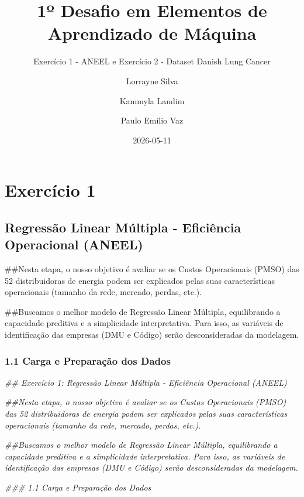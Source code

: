 \documentclass[
  letterpaper,
]{article}
\title{1º Desafio em Elementos de Aprendizado de Máquina}
\subtitle{Exercício 1 - ANEEL e Exercício 2 - Dataset Danish Lung
Cancer}
\author{Lorrayne Silva \and Kammyla Landim \and Paulo Emílio Vaz}
\date{2026-05-11}
\newenvironment{Shaded}{\begin{snugshade}}{\end{snugshade}}
\newcommand{\DocumentationTok}[1]{\textcolor[rgb]{0.37,0.37,0.37}{\textit{#1}}}
\renewcommand*\contentsname{Table of contents}
\newcommand\contentsname{Table of contents}
\begin{document}
\maketitle

\renewcommand*\contentsname{Table of contents}
{
\setcounter{tocdepth}{3}
\tableofcontents
}

\section{Exercício 1}\label{exercuxedcio-1}

\subsection{Regressão Linear Múltipla - Eficiência Operacional
(ANEEL)}\label{regressuxe3o-linear-muxfaltipla---eficiuxeancia-operacional-aneel}

\#\#Nesta etapa, o nosso objetivo é avaliar se os Custos Operacionais
(PMSO) das 52 distribuidoras de energia podem ser explicados pelas suas
características operacionais (tamanho da rede, mercado, perdas, etc.).

\#\#Buscamos o melhor modelo de Regressão Linear Múltipla, equilibrando
a capacidade preditiva e a simplicidade interpretativa. Para isso, as
variáveis de identificação das empresas (DMU e Código) serão
desconsideradas da modelagem.

\subsubsection{1.1 Carga e Preparação dos
Dados}\label{carga-e-preparauxe7uxe3o-dos-dados}

\begin{Shaded}
\begin{Highlighting}[]
\DocumentationTok{\#\# Exercício 1: Regressão Linear Múltipla {-} Eficiência Operacional (ANEEL)}

\DocumentationTok{\#\#Nesta etapa, o nosso objetivo é avaliar se os Custos Operacionais (PMSO) das 52 distribuidoras de energia podem ser explicados pelas suas características operacionais (tamanho da rede, mercado, perdas, etc.). }

\DocumentationTok{\#\#Buscamos o melhor modelo de Regressão Linear Múltipla, equilibrando a capacidade preditiva e a simplicidade interpretativa. Para isso, as variáveis de identificação das empresas (DMU e Código) serão desconsideradas da modelagem.}

\DocumentationTok{\#\#\# 1.1 Carga e Preparação dos Dados}
\end{Highlighting}
\end{Shaded}
\end{document}
